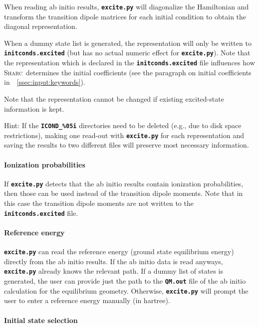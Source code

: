 \documentclass[a4paper,10pt,DIV=15,openany,twoside=false]{scrbook}
\newcommand{\sharc}{\textsc{Sharc}}
\newcommand{\ttt}[1]{\textbf{\texttt{#1}}}
\begin{document}
When reading ab initio results, \ttt{excite.py} will diagonalize the Hamiltonian and transform the transition dipole matrices for each initial condition to obtain the diagonal representation. 

When a dummy state list is generated, the representation will only be written to \ttt{initconds.excited} (but has no actual numeric effect for \ttt{excite.py}). Note that the representation which is declared in the \ttt{initconds.excited} file influences how \sharc\ determines the initial coefficients (see the paragraph on initial coefficients in~~\ref{ssec:input:keywords}).

Note that the representation cannot be changed if existing excited-state information is kept. 

Hint: If the \ttt{ICOND\_\%05i} directories need to be deleted (e.g., due to disk space restrictions), making one read-out with \ttt{excite.py} for each representation and saving the results to two different files will preserve most necessary information.

\paragraph{Ionization probabilities}

If \ttt{excite.py} detects that the ab initio results contain ionization probabilities, then those can be used instead of the transition dipole moments. Note that in this case the transition dipole moments are not written to the \ttt{initconds.excited} file. 

\paragraph{Reference energy}

\ttt{excite.py} can read the reference energy (ground state equilibrium energy) directly from the ab initio results. If the ab initio data is read anyways, \ttt{excite.py} already knows the relevant path. If a dummy list of states is generated, the user can provide just the path to the \ttt{QM.out} file of the ab initio calculation for the equilibrium geometry. Otherwise, \ttt{excite.py} will prompt the user to enter a reference energy manually (in hartree).

\paragraph{Initial state selection}
\end{document}

